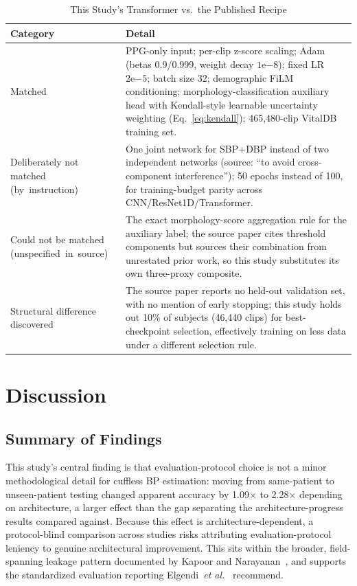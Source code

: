 \documentclass[journal]{IEEEtran}
\begin{document}
\begin{table}[!t]
\caption{This Study's Transformer vs.\ the Published Recipe \cite{shen2026}}
\label{tab:dmt}
\centering
\begin{tabular}{p{2.9cm}p{13.9cm}}
\toprule
Category & Detail \\
\midrule
Matched & PPG-only input; per-clip z-score scaling; Adam (betas 0.9/0.999, weight decay $1\mathrm{e}{-8}$); fixed LR $2\mathrm{e}{-5}$; batch size 32; demographic FiLM conditioning; morphology-classification auxiliary head with Kendall-style learnable uncertainty weighting (Eq.~\eqref{eq:kendall}); 465,480-clip VitalDB training set. \\
Deliberately not matched (by~instruction) & One joint network for SBP+DBP instead of two independent networks (source: ``to avoid cross-component interference''); 50 epochs instead of 100, for training-budget parity across CNN/ResNet1D/Transformer. \\
Could not be matched (unspecified~in~source) & The exact morphology-score aggregation rule for the auxiliary label; the source paper cites threshold components but sources their combination from unrestated prior work, so this study substitutes its own three-proxy composite. \\
Structural difference discovered & The source paper reports no held-out validation set, with no mention of early stopping; this study holds out 10\% of subjects (46,440 clips) for best-checkpoint selection, effectively training on less data under a different selection rule. \\
\bottomrule
\end{tabular}
\end{table}

\section{Discussion}

\subsection{Summary of Findings}
This study's central finding is that evaluation-protocol choice is not a minor methodological detail for cuffless BP estimation: moving from same-patient to unseen-patient testing changed apparent accuracy by 1.09$\times$ to 2.28$\times$ depending on architecture, a larger effect than the gap separating the architecture-progress results compared against. Because this effect is architecture-dependent, a protocol-blind comparison across studies risks attributing evaluation-protocol leniency to genuine architectural improvement. This sits within the broader, field-spanning leakage pattern documented by Kapoor and Narayanan~\cite{kapoor2023}, and supports the standardized evaluation reporting Elgendi~\textit{et al.}~\cite{elgendi2024} recommend.
\end{document}
